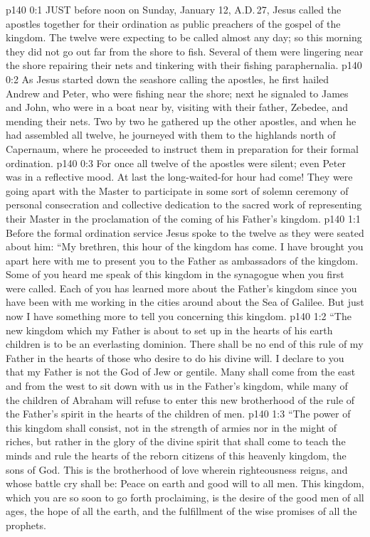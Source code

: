 \vs p140 0:1 JUST before noon on Sunday, January 12, A.D.\,27, Jesus called the apostles together for their ordination as public preachers of the gospel of the kingdom. The twelve were expecting to be called almost any day; so this morning they did not go out far from the shore to fish. Several of them were lingering near the shore repairing their nets and tinkering with their fishing paraphernalia.
\vs p140 0:2 As Jesus started down the seashore calling the apostles, he first hailed Andrew and Peter, who were fishing near the shore; next he signaled to James and John, who were in a boat near by, visiting with their father, Zebedee, and mending their nets. Two by two he gathered up the other apostles, and when he had assembled all twelve, he journeyed with them to the highlands north of Capernaum, where he proceeded to instruct them in preparation for their formal ordination.
\vs p140 0:3 For once all twelve of the apostles were silent; even Peter was in a reflective mood. At last the long\hyp{}waited\hyp{}for hour had come! They were going apart with the Master to participate in some sort of solemn ceremony of personal consecration and collective dedication to the sacred work of representing their Master in the proclamation of the coming of his Father’s kingdom.
\vs p140 1:1 Before the formal ordination service Jesus spoke to the twelve as they were seated about him: \textcolor{ubdarkred}{“My brethren, this hour of the kingdom has come. I have brought you apart here with me to present you to the Father as ambassadors of the kingdom. Some of you heard me speak of this kingdom in the synagogue when you first were called. Each of you has learned more about the Father’s kingdom since you have been with me working in the cities around about the Sea of Galilee. But just now I have something more to tell you concerning this kingdom.}
\vs p140 1:2 \textcolor{ubdarkred}{“The new kingdom which my Father is about to set up in the hearts of his earth children is to be an everlasting dominion. There shall be no end of this rule of my Father in the hearts of those who desire to do his divine will. I declare to you that my Father is not the God of Jew or gentile. Many shall come from the east and from the west to sit down with us in the Father’s kingdom, while many of the children of Abraham will refuse to enter this new brotherhood of the rule of the Father’s spirit in the hearts of the children of men.}
\vs p140 1:3 \textcolor{ubdarkred}{“The power of this kingdom shall consist, not in the strength of armies nor in the might of riches, but rather in the glory of the divine spirit that shall come to teach the minds and rule the hearts of the reborn citizens of this heavenly kingdom, the sons of God. This is the brotherhood of love wherein righteousness reigns, and whose battle cry shall be: Peace on earth and good will to all men. This kingdom, which you are so soon to go forth proclaiming, is the desire of the good men of all ages, the hope of all the earth, and the fulfillment of the wise promises of all the prophets.}
